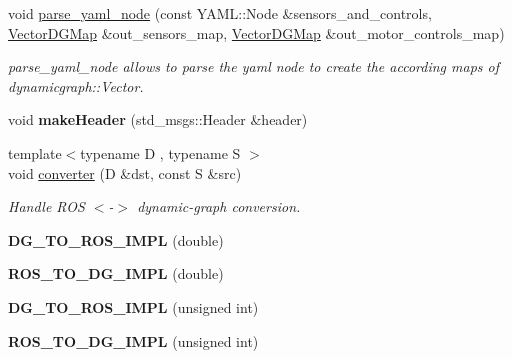 \begin{DoxyCompactItemize}
void \hyperlink{namespacedynamic__graph_a3473e2d5502f8a2bff6b43cbc2d35e07}{parse\+\_\+yaml\+\_\+node} (const Y\+A\+M\+L\+::\+Node \&sensors\+\_\+and\+\_\+controls, \hyperlink{namespacedynamic__graph_a51212ed7fa4ae81e7b362a27f09b7ab8}{Vector\+D\+G\+Map} \&out\+\_\+sensors\+\_\+map, \hyperlink{namespacedynamic__graph_a51212ed7fa4ae81e7b362a27f09b7ab8}{Vector\+D\+G\+Map} \&out\+\_\+motor\+\_\+controls\+\_\+map)
\begin{DoxyCompactList}\small\item\em parse\+\_\+yaml\+\_\+node allows to parse the yaml node to create the according maps of dynamicgraph\+::\+Vector. \end{DoxyCompactList}\item 
\mbox{\label{namespacedynamic__graph_a7932709c47f2977a4478bd6f035ee12b}} 
void {\bfseries make\+Header} (std\+\_\+msgs\+::\+Header \&header)
\item 
{\footnotesize template$<$typename D , typename S $>$ }\\void \hyperlink{namespacedynamic__graph_aa00932c9efb8a607efd6997386d78680}{converter} (D \&dst, const S \&src)
\begin{DoxyCompactList}\small\item\em Handle R\+OS $<$-\/$>$ dynamic-\/graph conversion. \end{DoxyCompactList}\item 
\mbox{\label{namespacedynamic__graph_a22ff0d85472d1b606719f789a73224c3}} 
{\bfseries D\+G\+\_\+\+T\+O\+\_\+\+R\+O\+S\+\_\+\+I\+M\+PL} (double)
\item 
\mbox{\label{namespacedynamic__graph_a8487bee8650edee2dabb3c21662f411f}} 
{\bfseries R\+O\+S\+\_\+\+T\+O\+\_\+\+D\+G\+\_\+\+I\+M\+PL} (double)
\item 
\mbox{\label{namespacedynamic__graph_a894a6396a849e5a251f807e42f160c28}} 
{\bfseries D\+G\+\_\+\+T\+O\+\_\+\+R\+O\+S\+\_\+\+I\+M\+PL} (unsigned int)
\item 
\mbox{\label{namespacedynamic__graph_afd65ab6689e1cc46f28c0c6e365f0ff6}} 
{\bfseries R\+O\+S\+\_\+\+T\+O\+\_\+\+D\+G\+\_\+\+I\+M\+PL} (unsigned int)
\item 
\mbox{\label{namespacedynamic__graph_ac2a5616ba0bc2168c574b16fb4512b1c}} 

\end{DoxyCompactItemize}
